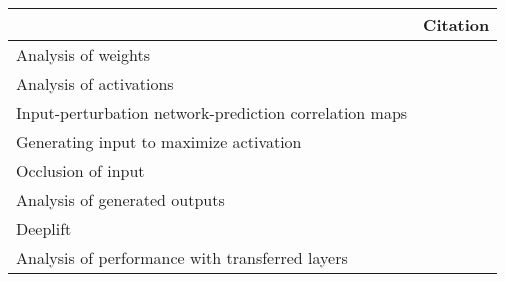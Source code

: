 \begin{tabular}{ll}
\toprule
{} &                                                                                                                                                                                          Citation \\
\midrule
Analysis of weights                                    &  \cite{Perez-Benitez2018, Yoon2018, Langkvist2018, Deiss2018, Lawhern2018, Xu2016, Tsinalis2016a, Nurse2016, Tabar2016a, Zheng2015, Stober2015, Manor2015, Yang2015a, Langkvist2012, Cecotti2011} \\
Analysis of activations                                &                                                                                           \cite{Yuan2018a, Waytowich2018, Lawhern2018, kwak2017, Yin2017a, Supratak2017, Shamwell2016, Manor2015} \\
Input-perturbation network-prediction correlation maps &                                                                                                              \cite{Schirrmeister2017a, Volker2018, Hartmann2018b, Behncke2017, Schirrmeister2017} \\
Generating input to maximize activation                &                                                                                                                                      \cite{VanPutten2018b, Ruffini2018a, Sors2018, Bashivan2016a} \\
Occlusion of input                                     &                                                                                                                                                        \cite{Lee2018, Chambon2018, Thodoroff2016} \\
Analysis of generated outputs                          &                                                                                                                                                                               \cite{Hartmann2018} \\
Deeplift                                               &                                                                                                                                                                                \cite{Lawhern2018} \\
Analysis of performance with transferred layers        &                                                                                                                                                                            \cite{Hajinoroozi2017} \\

\end{tabular}
